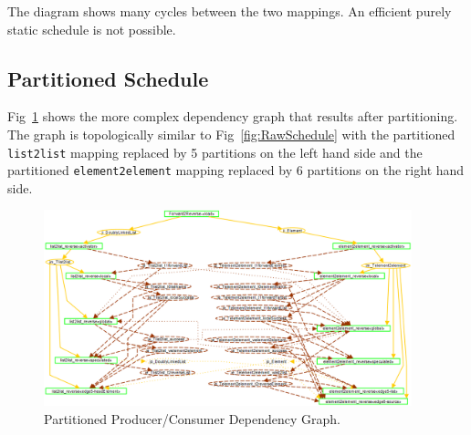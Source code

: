 \documentclass{llncs}
\begin{document}
The diagram shows many cycles between the two mappings. An efficient purely static schedule is not possible.

\subsection{Partitioned Schedule}




Fig~\ref{fig:PartitionedSchedule} shows the more complex dependency graph that results after partitioning. The graph is topologically similar to Fig~\ref{fig:RawSchedule} with the partitioned \verb$list2list$ mapping replaced by 5 partitions on the left hand side and the partitioned \verb$element2element$ mapping replaced by 6 partitions on the right hand side.

\begin{figure}[h]
	\centering
	\includegraphics[width=0.95\textwidth]{PartitionedSchedule.png}
	\caption{Partitioned Producer/Consumer Dependency Graph.}
	\label{fig:PartitionedSchedule}
\end{figure}
\end{document}
